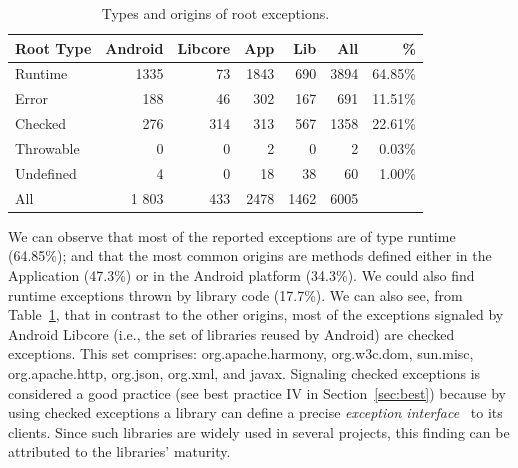 \begin{table}
\scriptsize
\centering
\begin{tabular}{lrrrrrr}
    \hline
    \bfseries{Root Type} & \bfseries{Android} & \bfseries{Libcore} & \bfseries{App} & \bfseries{Lib}  & \bfseries{All} & \bfseries{\%} \\
    \hline

Runtime	&	1335	&	73	&	1843	&	690  &	3894 & 64.85\% \\  %
Error	       &	 188              &	 46	&	302             &	167	           &	691 & 11.51\%	\\
Checked	&	276           &	314	&	313          &	567	           &	1358 & 22.61\%	\\
Throwable	&	0	       &	0	&	2            &	0         &	2 & 0.03\%	\\
Undefined	&	4	&	0	&	18		&	38	   &	60	& 1.00\% \\
 \hline
All		& 1  803	&	433	&	2478	&	1462	&	6005 	\\
    \hline
  \end{tabular}
\caption{Types and origins of root exceptions.}
  \label{tab:typeroottab}
\end{table}


We can observe that most of the reported exceptions are of type runtime
(64.85\%); and that the most common origins are methods defined either in the Application (47.3\%)
or in the Android platform (34.3\%). We could also find runtime exceptions thrown by library code (17.7\%).
 We can also see, from Table~\ref{tab:typeroottab}, that in contrast to the other origins, most of the
 exceptions signaled by Android Libcore (i.e., the set of libraries reused by Android) are
checked exceptions. This set comprises: org.apache.harmony, org.w3c.dom, sun.misc,
org.apache.http, org.json, org.xml, and javax. Signaling checked exceptions is considered a
good practice (see best practice IV in Section~\ref{sec:best}) because by using
checked exceptions a library can define a precise
\emph{exception interface}~\cite{miller1997issues} to its clients.
 Since such libraries are widely used  in several projects, this
 finding can be attributed to the libraries' maturity.

\bigskip


\bigskip

